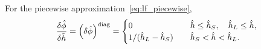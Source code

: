 \documentclass{article}
\newcommand{\diag}[1]{\qty(#1)^\mathrm{diag}}
\begin{document}
For the piecewise approximation~\eqref{eq:lf_piecewise},
\begin{equation}
	\fdv{\hat{\phi}}{\hat{h}} = \diag{\var{\hat{\phi}}} = \begin{cases}
        0 & \quad \hat{h} \leq \hat{h}_S, \quad \hat{h}_L \leq \hat{h}, \\
        1/(\hat{h}_L-\hat{h}_S) & \quad \hat{h}_S < \hat{h} < \hat{h}_L. \\
    \end{cases} \label{eq:pert_phi_h_diag}
\end{equation}
\end{document}
